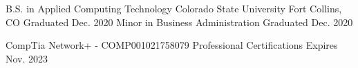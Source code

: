 



\begin{cventries}
  \dualeducation
    {B.S. in Applied Computing Technology} %
    {Colorado State University} %
    {Fort Collins, CO} %
    {Graduated Dec. 2020} %
    {Minor in Business Administration} %
    {Graduated Dec. 2020} %


  \vspace{-5.0mm} 
  \certentry
    {CompTia Network+ - COMP001021758079} %
    {Professional Certifications} %
    {Expires Nov. 2023} %
    {}
    {}
\end{cventries}

